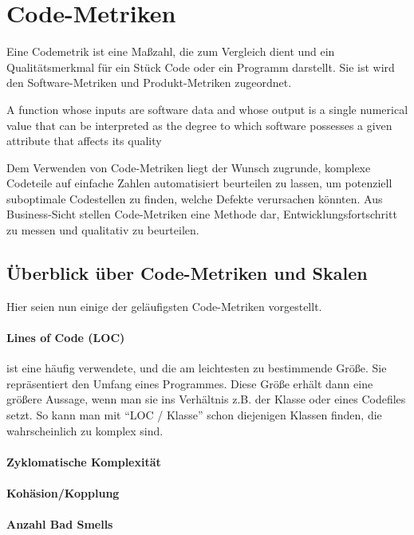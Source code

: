 \section{Code-Metriken}
Eine Codemetrik ist eine Maßzahl, die zum Vergleich dient und ein Qualitätsmerkmal für ein Stück Code oder ein Programm darstellt. Sie ist wird den Software-Metriken und Produkt-Metriken zugeordnet.

\epigraph{A function whose inputs are software data and whose output is a single
numerical value that can be interpreted as the degree to which software possesses a given attribute that affects its quality}{\cite{ieee_1998}}

Dem Verwenden von Code-Metriken liegt der Wunsch zugrunde, komplexe Codeteile auf einfache Zahlen automatisiert beurteilen zu lassen, um potenziell suboptimale Codestellen zu finden, welche Defekte verursachen könnten. Aus Business-Sicht stellen Code-Metriken eine Methode dar, Entwicklungsfortschritt zu messen und qualitativ zu beurteilen.
\subsection{Überblick über Code-Metriken und Skalen}
Hier seien nun einige der geläufigsten Code-Metriken vorgestellt.
\paragraph{Lines of Code (LOC)} ist eine häufig verwendete, und die am leichtesten zu bestimmende Größe. Sie repräsentiert den Umfang eines Programmes. Diese Größe erhält dann eine größere Aussage, wenn man sie ins Verhältnis z.B. der Klasse oder eines Codefiles setzt. So kann man mit "`LOC / Klasse"' schon diejenigen Klassen finden, die wahrscheinlich zu komplex sind.

\paragraph{Zyklomatische Komplexität}

\paragraph{Kohäsion/Kopplung}

\paragraph{Anzahl Bad Smells}
\citep{mccabe_complexity_1976}

